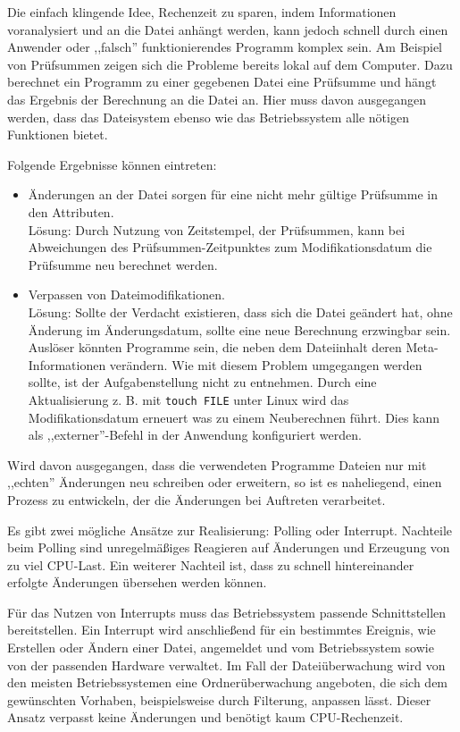 \documentclass[oneside, ngerman, toc=bibliography,bibliography=totoc,listof=entryprefix, open=right,numbers=noenddot,fontsize=12pt]{scrbook}
\begin{document}
Die einfach klingende Idee, Rechenzeit zu sparen, indem Informationen voranalysiert und an die Datei anhängt werden, kann jedoch schnell durch einen Anwender oder ,,falsch'' funktionierendes Programm komplex sein. Am Beispiel von Prüfsummen zeigen sich die Probleme bereits lokal auf dem Computer. Dazu berechnet ein Programm zu einer gegebenen Datei eine Prüfsumme und hängt das Ergebnis der Berechnung an die Datei an. Hier muss davon ausgegangen werden, dass das Dateisystem ebenso wie das Betriebssystem alle nötigen Funktionen bietet.

\bigskip
Folgende Ergebnisse können eintreten:
\begin{itemize}
	\item Änderungen an der Datei sorgen für eine nicht mehr gültige Prüfsumme in den Attributen.\\
    Lösung: Durch Nutzung von Zeitstempel, der Prüfsummen, kann bei Abweichungen des Prüfsummen-Zeitpunktes zum Modifikationsdatum die Prüfsumme neu berechnet werden.
    
	\item Verpassen von Dateimodifikationen.\\
     Lösung: Sollte der Verdacht existieren, dass sich die Datei geändert hat, ohne Änderung im Änderungsdatum, sollte eine neue Berechnung erzwingbar sein.
     Auslöser könnten Programme sein, die neben dem Dateiinhalt deren Meta-Informationen verändern. Wie mit diesem Problem umgegangen werden sollte, ist der Aufgabenstellung nicht zu entnehmen. 
     Durch eine Aktualisierung z. B. mit \verb|touch FILE| unter Linux wird das Modifikationsdatum erneuert was zu einem Neuberechnen führt.
     Dies kann als ,,externer''-Befehl in der Anwendung konfiguriert werden.
     
\end{itemize}

Wird davon ausgegangen, dass die verwendeten Programme Dateien nur mit ,,echten'' Änderungen neu schreiben oder erweitern, so ist es naheliegend, einen Prozess zu entwickeln, der die Änderungen bei Auftreten verarbeitet.

Es gibt zwei mögliche Ansätze zur Realisierung: {Polling} oder {Interrupt}. Nachteile beim Polling sind unregelmäßiges Reagieren auf Änderungen und Erzeugung von zu viel CPU-Last. Ein weiterer Nachteil ist, dass zu schnell hintereinander erfolgte Änderungen übersehen werden können.

Für das Nutzen von {Interrupts} muss das Betriebssystem passende Schnittstellen bereitstellen. Ein {Interrupt} wird anschließend für ein bestimmtes Ereignis, wie Erstellen oder Ändern einer Datei, angemeldet und vom Betriebssystem sowie von der passenden Hardware verwaltet. Im Fall der Dateiüberwachung wird von den meisten Betriebssystemen eine Ordnerüberwachung angeboten, die sich dem gewünschten Vorhaben, beispielsweise durch Filterung, anpassen lässt. Dieser Ansatz verpasst keine Änderungen und benötigt kaum CPU-Rechenzeit.
\end{document}

